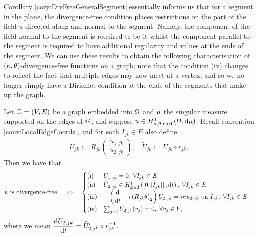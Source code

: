 Corollary \ref{cory:DivFreeGeneralSegment} essentially informs us that for a segment in the plane, the divergence-free condition places restrictions on the part of the field $u$ directed along and normal to the segment.
Namely, the component of the field normal to the segment is required to be $0$, whilst the component parallel to the segment is required to have additional regularity and values at the ends of the segment.
We can use these results to obtain the following characterisation of $\left( \kappa, \theta \right)$-divergence-free functions on a graph; note that the condition (iv) changes to reflect the fact that multiple edges may now meet at a vertex, and so we no longer simply have a Dirichlet condition at the ends of the segments that make up the graph.
\begin{theorem} \label{thm:DivFreeWholeGraph}
	Let $\mathbb{G}=\left( V,E \right)$ be a graph embedded into $\Omega$ and $\mu$ the singular measure supported on the edges of $\mathbb{G}$, and suppose $u\in H^1_{\kappa,\theta,\mathrm{curl}}\left( \Omega, \mathrm{d}\mu \right)$.
	Recall convention \ref{conv:LocalEdgeCoords}, and for each $I_{jk}\in E$ also define
	\begin{align*}
		U_{jk} := R_{jk}\begin{pmatrix} u_{1,jk} \\ u_{2,jk} \end{pmatrix}, \quad
		\widetilde{U}_{jk} := U_{jk} \circ r_{jk},
	\end{align*}
	Then we have that
	\begin{align*}
		u \text{ is divergence-free } &\quad\Leftrightarrow\quad
		\begin{cases}
		\mathrm{(i)} & U_{1,jk} = 0, \ \forall I_{jk}\in E\\
		\mathrm{(ii)} & \widetilde{U}_{2,jk} \in \gradSob{\interval{I_{jk}}}{t}, \ \forall I_{jk}\in E \\
		\mathrm{(iii)} & -\bracs{\diff{}{t} + i\bracs{R_{jk}\qm}_2}U_{2,jk} = i\wavenumber u_{3,jk} \text{ on } I_{jk}, \ \forall I_{jk}\in E\\
		\mathrm{(iv)} & \sum_{j\con l}U_{2,jl}\bracs{v_j} = 0, \ \forall v_j\in V,
		\end{cases}
	\end{align*}
	where we mean $\dfrac{\mathrm{d}U_{2,jk}}{\mathrm{d}t} = \widetilde{U}_{2,jk}' \circ r_{jk}^{-1}$.
\end{theorem}
